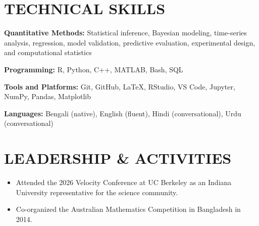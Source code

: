 \documentclass[10pt,letterpaper]{article}
\newenvironment{resumeItems}{%
	\begin{itemize}[
		label=\textbullet,
		leftmargin=14pt,
		labelsep=5pt,
		itemsep=0.5pt,
		topsep=1.0pt,
		parsep=0pt,
		partopsep=0pt
	]
}{%
	\end{itemize}
}
\begin{document}
\section*{TECHNICAL SKILLS}

\textbf{Quantitative Methods:}
Statistical inference, Bayesian modeling, time-series analysis, regression, model validation, predictive evaluation, experimental design, and computational statistics

\textbf{Programming:}
R, Python, C++, MATLAB, Bash, SQL

\textbf{Tools and Platforms:}
Git, GitHub, LaTeX, RStudio, VS Code, Jupyter, NumPy, Pandas, Matplotlib

\textbf{Languages:}
Bengali (native), English (fluent), Hindi (conversational), Urdu (conversational)

\section*{LEADERSHIP \& ACTIVITIES}

\begin{resumeItems}
	\item Attended the 2026 Velocity Conference at UC Berkeley as an Indiana University representative for the science community.


	\item Co-organized the Australian Mathematics Competition in Bangladesh in 2014.
\end{resumeItems}
\end{document}
